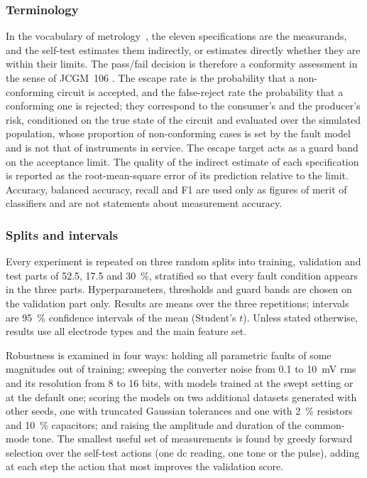 \subsubsection{Terminology}
In the vocabulary of metrology~\cite{vim,gum}, the eleven specifications are the measurands, and
the self-test estimates them indirectly, or estimates directly whether they are within their
limits. The pass/fail decision is therefore a conformity assessment in the sense of JCGM~106
\cite{jcgm106}. The escape rate is the probability that a non-conforming circuit is accepted,
and the false-reject rate the probability that a conforming one is rejected; they correspond to
the consumer's and the producer's risk, conditioned on the true state of the circuit and
evaluated over the simulated population, whose proportion of non-conforming cases is set by the
fault model and is not that of instruments in service. The escape target acts as a guard band on
the acceptance limit. The quality of the indirect estimate of each specification is reported as
the root-mean-square error of its prediction relative to the limit. Accuracy, balanced accuracy,
recall and F1 are used only as figures of merit of classifiers and are not statements about
measurement accuracy.

\subsubsection{Splits and intervals}
Every experiment is repeated on three random splits into training, validation and test parts of
52.5, 17.5 and \SI{30}{\percent}, stratified so that every fault condition appears in the three
parts. Hyperparameters, thresholds and guard bands are chosen on the validation part only.
Results are means over the three repetitions; intervals are \SI{95}{\percent} confidence
intervals of the mean (Student's $t$). Unless stated otherwise, results use all electrode types
and the main feature set.

Robustness is examined in four ways: holding all parametric faults of some magnitudes out of
training; sweeping the converter noise from 0.1 to \SI{10}{\milli\volt} rms and its resolution
from 8 to 16 bits, with models trained at the swept setting or at the default one; scoring the
models on two additional datasets generated with other seeds, one with truncated Gaussian
tolerances and one with \SI{2}{\percent} resistors and \SI{10}{\percent} capacitors; and raising
the amplitude and duration of the common-mode tone. The smallest useful set of measurements is
found by greedy forward selection over the self-test actions (one dc reading, one tone or the
pulse), adding at each step the action that most improves the validation score.
